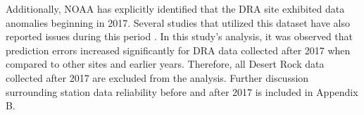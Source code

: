 \documentclass[preprint,12pt]{elsarticle}
\begin{document}



Additionally, NOAA has explicitly identified that the DRA site exhibited data anomalies beginning in 2017. Several studies that utilized this dataset have also reported issues during this period \citep{matsunobu2024effective,li2017determination}. In this study's analysis, it was observed that prediction errors increased significantly for DRA data collected after 2017 when compared to other sites and earlier years.
Therefore, all Desert Rock data collected after 2017 are excluded from the analysis. Further discussion surrounding station data reliability before and after 2017 is included in Appendix B. 
\end{document}
